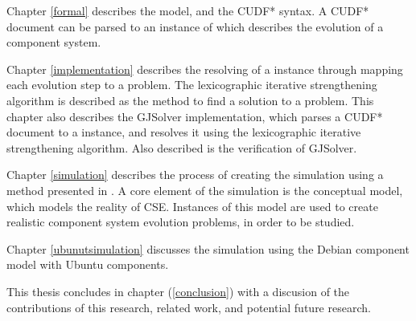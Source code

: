 Chapter \ref{formal} describes the \modelname model, and the CUDF* syntax.
A CUDF* document can be parsed to an instance of \modelname which describes the evolution of a component system.

Chapter \ref{implementation} describes the resolving of a \modelname instance through mapping each evolution step to a \modelimpl problem.
The lexicographic iterative strengthening algorithm is described as the method to find a solution to a \modelimpl problem.
This chapter also describes the GJSolver implementation, which parses a CUDF* document to a \modelname instance, and resolves it using the lexicographic iterative strengthening algorithm.
Also described is the verification of GJSolver.

Chapter \ref{simulation} describes the process of creating the simulation using a method presented in \citep{Law2005}.
A core element of the simulation is the conceptual model, which models the reality of CSE.
Instances of this model are used to create realistic component system evolution problems, in order to be studied.

Chapter \ref{ubunutsimulation} discusses the simulation using the Debian component model \citep{Barth2005} with Ubuntu \citep{Hill2006} components. 

This thesis concludes in chapter (\ref{conclusion}) with a discusion of the contributions of this research, related work, and potential future research.